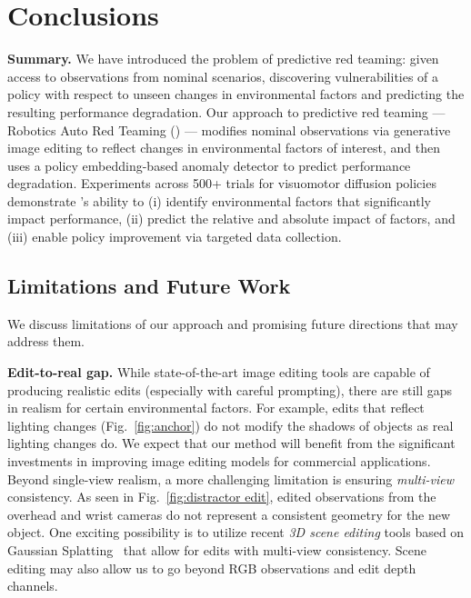 \section{Conclusions}
\label{sec:conclusions}

{\bf Summary.} We have introduced the problem of predictive red teaming: given access to observations from nominal scenarios, discovering vulnerabilities of a policy with respect to unseen changes in environmental factors and predicting the resulting performance degradation. Our approach to predictive red teaming --- Robotics Auto Red Teaming (\redit) --- modifies nominal observations via generative image editing to reflect changes in environmental factors of interest, and then uses a policy embedding-based anomaly detector to predict performance degradation. Experiments across 500+ trials for visuomotor diffusion policies demonstrate \redit's ability to (i) identify environmental factors that significantly impact performance, (ii) predict the relative and absolute impact of factors, and (iii) enable policy improvement via targeted data collection.   

\subsection{Limitations and Future Work}
\label{sec:future work}

We discuss limitations of our approach and promising future directions that may address them. 

{\bf Edit-to-real gap.} While state-of-the-art image editing tools are capable of producing realistic edits (especially with careful prompting), there are still gaps in realism for certain environmental factors. For example, edits that reflect lighting changes (Fig.~\ref{fig:anchor}) do not modify the shadows of objects as real lighting changes do. We expect that our method will benefit from the significant investments in improving image editing models for commercial applications. 
Beyond single-view realism, a more challenging limitation is ensuring \emph{multi-view} consistency. As seen in Fig.~\ref{fig:distractor edit}, edited observations from the overhead and wrist cameras do not represent a consistent geometry for the new object. One exciting possibility is to utilize recent \emph{3D scene editing} tools based on Gaussian Splatting~\cite{chen2024proedit, bao20243d} that allow for edits with multi-view consistency. Scene editing may also allow us to go beyond RGB observations and edit depth channels. 

